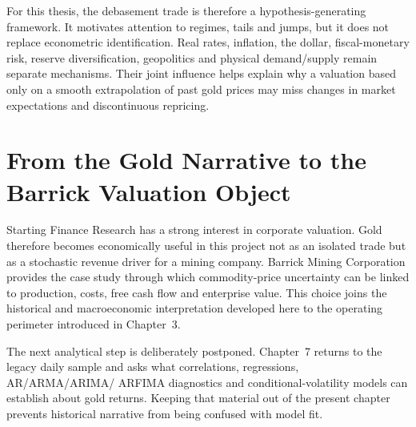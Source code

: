 For this thesis, the debasement trade is therefore a hypothesis-generating
framework. It motivates attention to regimes, tails and jumps, but it does not
replace econometric identification. Real rates, inflation, the dollar,
fiscal-monetary risk, reserve diversification, geopolitics and physical
demand/supply remain separate mechanisms. Their joint influence helps explain
why a valuation based only on a smooth extrapolation of past gold prices may
miss changes in market expectations and discontinuous repricing.

\section{From the Gold Narrative to the Barrick Valuation Object}

Starting Finance Research has a strong interest in corporate valuation. Gold
therefore becomes economically useful in this project not as an isolated trade
but as a stochastic revenue driver for a mining company. Barrick Mining
Corporation provides the case study through which commodity-price uncertainty
can be linked to production, costs, free cash flow and enterprise value. This
choice joins the historical and macroeconomic interpretation developed here to
the operating perimeter introduced in Chapter~3.

The next analytical step is deliberately postponed. Chapter~7 returns to the
legacy daily sample and asks what correlations, regressions, AR/ARMA/ARIMA/
ARFIMA diagnostics and conditional-volatility models can establish about gold
returns. Keeping that material out of the present chapter prevents historical
narrative from being confused with model fit.
